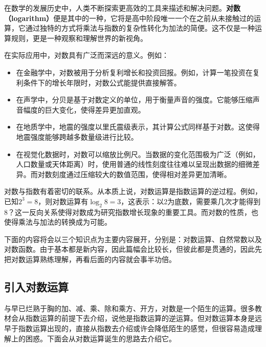 \begin{issues}
\issueDraft
\end{issues}


在数学的发展历史中，人类不断探索更高效的工具来描述和解决问题。\textbf{对数（logarithm）}便是其中的一种，它将是高中阶段唯一一个在之前从未接触过的运算，它通过独特的方式将乘法与指数的复杂性转化为加法的简便。这不仅是一种运算规则，更是一种观察和理解世界的新视角。

在实际应用中，对数具有广泛而深远的意义。例如：

\begin{itemize}
\item 在金融学中，对数被用于分析复利增长和投资回报。例如，计算一笔投资在复利条件下的增长年限时，对数公式能提供直接解答。
\item 在声学中，分贝是基于对数定义的单位，用于衡量声音的强度。它能够压缩声音幅度的巨大变化，使得差异更加直观。
\item 在地质学中，地震的强度以里氏震级表示，其计算公式同样基于对数。这使得地震强度能够跨越多数量级进行比较。
\item 在视觉化数据时，对数可以缩放比例尺。当数据的变化范围极为广泛（例如，人口数量或天体距离）时，使用普通的线性刻度往往难以呈现出数据的细微差异。而对数刻度通过压缩较大的数值范围，使得相对差异更加清晰。
\end{itemize}

对数与指数有着密切的联系。从本质上说，对数运算是指数运算的逆过程。例如，已知$2^3 = 8$，则对数运算有$\log_2 8 = 3$，这表示：以2为底数，需要乘几次才能得到8？这一反向关系使得对数成为研究指数增长现象的重要工具。而对数的性质，也使得乘法与加法的转换成为可能。

下面的内容将会以三个知识点为主要内容展开，分别是：对数运算、自然常数以及对数函数。由于基本都是新内容，因此篇幅会比较长，但彼此都是贯通的，因此先把对数运算熟练理解，再看后面的内容就会事半功倍。

\subsection{引入对数运算}

与早已烂熟于胸的加、减、乘、除和乘方、开方，对数是一个陌生的运算。很多教材会从指数运算的前提下去介绍，说他是指数运算的逆运算。但对数运算本身是远早于指数运算出现的，直接从指数去介绍或许会降低陌生的感觉，但很容易造成理解上的困惑。下面会从对数运算诞生的思路去介绍它。

